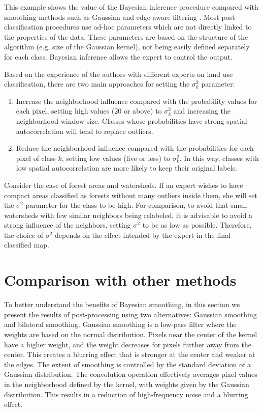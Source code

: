 \documentclass[
  shortnames]{jss}
\begin{document}
This example shows the value of the Bayesian inference procedure compared with smoothing methods such as Gaussian and edge-aware filtering \citep{Schindler2012}. Most post-classification procedures use ad-hoc parameters which are not directly linked to the properties of the data. These parameters are based on the structure of the algorithm (e.g, size of the Gaussian kernel), not being easily defined separately for each class. Bayesian inference allows the expert to control the output.

Based on the experience of the authors with different experts on land use classification, there are two main approaches for setting the \(\sigma^2_{k}\) parameter:

\begin{enumerate}
\def\labelenumi{\arabic{enumi}.}
\item
  Increase the neighborhood influence compared with the probability values for each pixel, setting high values (20 or above) to \(\sigma^2_{k}\) and increasing the neighborhood window size. Classes whose probabilities have strong spatial autocorrelation will tend to replace outliers.
\item
  Reduce the neighborhood influence compared with the probabilities for each pixel of class \(k\), setting low values (five or less) to \(\sigma^2_{k}\). In this way, classes with low spatial autocorrelation are more likely to keep their original labels.
\end{enumerate}

Consider the case of forest areas and watersheds. If an expert wishes to have compact areas classified as forests without many outliers inside them, she will set the \(\sigma^2\) parameter for the class  to be high. For comparison, to avoid that small watersheds with few similar neighbors being relabeled, it is advisable to avoid a strong influence of the neighbors, setting \(\sigma^2\) to be as low as possible. Therefore, the choice of \(\sigma^2\) depends on the effect intended by the expert in the final classified map.

\hypertarget{comparison-with-other-methods}{%
\section{Comparison with other methods}\label{comparison-with-other-methods}}

To better understand the benefits of Bayesian smoothing, in this section we present the results of post-processing using two alternatives: Gaussian smoothing and bilateral smoothing. Gaussian smoothing is a low-pass filter where the weights are based on the normal distribution. Pixels near the center of the kernel have a higher weight, and the weight decreases for pixels further away from the center. This creates a blurring effect that is stronger at the center and weaker at the edges. The extent of smoothing is controlled by the standard deviation of a Gaussian distribution. The convolution operation effectively averages pixel values in the neighborhood defined by the kernel, with weights given by the Gaussian distribution. This results in a reduction of high-frequency noise and a blurring effect.
\end{document}
